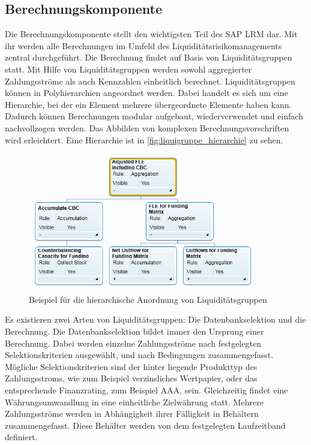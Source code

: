 \begin{onehalfspacing}
\subsection{Berechnungskomponente}
\label{sec:berechnungskomponente}
Die Berechnungskomponente stellt den wichtigsten Teil des SAP LRM dar. Mit ihr werden alle Berechnungen im Umfeld des Liquiditätsrisikomanagements zentral durchgeführt. Die Berechnung findet auf Basis von Liquiditätsgruppen statt. Mit Hilfe von Liquiditätsgruppen werden sowohl aggregierter Zahlungsströme als auch Kennzahlen einheitlich berechnet. Liquiditätsgruppen können in Polyhierarchien angeordnet werden. Dabei handelt es sich um eine Hierarchie, bei der ein Element mehrere übergeordnete Elemente haben kann. Dadurch können Berechnungen modular aufgebaut, wiederverwendet und einfach nachvollzogen werden. Das Abbilden von komplexen Berechnungsvorschriften wird erleichtert. Eine Hierarchie ist in \vref{fig:liquigruppe_hierarchie} zu sehen.

\begin{figure}[!ht]
\centering
\setlength{\unitlength}{1mm}
\includegraphics[width=10cm]{images/liquigruppe_hierarchie.PNG}
\caption{
Beispiel für die hierarchische Anordnung von Liquiditätsgruppen
\label{fig:liquigruppe_hierarchie}}
\end{figure}

Es existieren zwei Arten von Liquiditätsgruppen: Die Datenbankselektion und die Berechnung. Die Datenbankselektion bildet immer den Ursprung einer Berechnung. Dabei werden einzelne Zahlungsströme nach festgelegten Selektionskriterien ausgewählt, und nach Bedingungen zusammengefasst. Mögliche Selektionskriterien sind der hinter liegende Produkttyp des Zahlungsstroms, wie zum Beispiel verzinsliches Wertpapier, oder das entsprechende Finanzrating, zum Beispiel AAA, sein. Gleichzeitig findet eine Währungsumwandlung in eine einheitliche Zielwährung statt. Mehrere Zahlungsströme werden in Abhängigkeit ihrer Fälligkeit in Behältern zusammengefasst. Diese Behälter werden von dem festgelegten Laufzeitband definiert.


\end{onehalfspacing}
